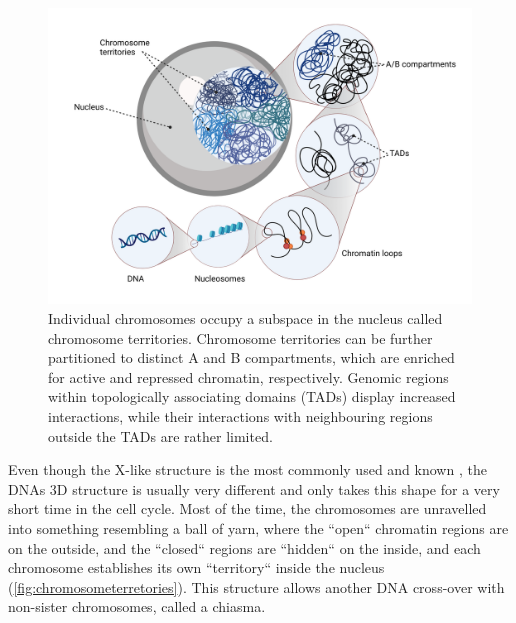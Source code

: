 \begin{figure}[!ht]
\centering
\includegraphics[width=0.9\linewidth]{Figures/intro/ChromosomeTerritories}
\caption[Overview DNA structure]{Individual chromosomes occupy a subspace in the nucleus called chromosome territories. Chromosome territories can be further partitioned to distinct A and B compartments, which are enriched for active and repressed chromatin, respectively. Genomic regions within topologically associating domains (TADs) display increased interactions, while their interactions with neighbouring regions outside the TADs are rather limited.}\label{fig:chromosometerretories}
\end{figure}

Even though the X-like structure is the most commonly used and known , the DNAs 3D structure is usually very different and only takes this shape for a very short time in the cell cycle. Most of the time, the chromosomes are unravelled into something resembling a ball of yarn, where the ``open`` chromatin regions are on the outside, and the ``closed`` regions are ``hidden`` on the inside, and each chromosome establishes its own ``territory`` inside the nucleus (\autoref{fig:chromosometerretories}). This structure allows another DNA cross-over with non-sister chromosomes,  called a chiasma.

